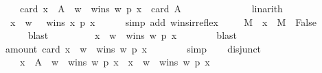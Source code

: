 \begin{isabellebody}
\ \ \ \ {\isachardoublequoteopen}card\ {\isacharbraceleft}{\kern0pt}x\ {\isasymin}\ A\ {\isacharminus}{\kern0pt}\ {\isacharbraceleft}{\kern0pt}w{\isacharbraceright}{\kern0pt}\ {\isachardot}{\kern0pt}\ wins\ w\ p\ x{\isacharbraceright}{\kern0pt}\ {\isacharequal}{\kern0pt}\ card\ {\isacharparenleft}{\kern0pt}A{\isacharparenright}{\kern0pt}\ {\isacharminus}{\kern0pt}\ {}{\isachardoublequoteclose}\isanewline
\ \ \ \ \isamarkupfalse%
\ {\isachardoublequoteopen}{}{}{\isachardoublequoteclose}\isanewline
\ \ \ \ \isamarkupfalse%
\ linarith\isanewline
\ \ \isamarkupfalse%
\ {}{\isacharcolon}{\kern0pt}\ {\isachardoublequoteopen}{\isasymforall}x\ {\isasymin}\ {\isacharbraceleft}{\kern0pt}w{\isacharbraceright}{\kern0pt}\ {\isachardot}{\kern0pt}\ {\isasymnot}\ wins\ x\ p\ x{\isachardoublequoteclose}\isanewline
\ \ \ \ \isamarkupfalse%
\ {\isacharparenleft}{\kern0pt}simp\ add{\isacharcolon}{\kern0pt}\ wins{\isacharunderscore}{\kern0pt}irreflex{\isacharparenright}{\kern0pt}\isanewline
\ \ \isamarkupfalse%
\ {}{\isacharcolon}{\kern0pt}\ {\isachardoublequoteopen}{\isasymforall}M\ {\isachardot}{\kern0pt}\ {\isacharbraceleft}{\kern0pt}x\ {\isasymin}\ M\ {\isachardot}{\kern0pt}\ False{\isacharbraceright}{\kern0pt}\ {\isacharequal}{\kern0pt}\ {\isacharbraceleft}{\kern0pt}{\isacharbraceright}{\kern0pt}{\isachardoublequoteclose}\isanewline
\ \ \ \ \isamarkupfalse%
\ blast\isanewline
\ \ \isamarkupfalse%
\ {}\ {}\isanewline
\ \ \isamarkupfalse%
\ {\isachardoublequoteopen}{\isacharbraceleft}{\kern0pt}x\ {\isasymin}\ {\isacharbraceleft}{\kern0pt}w{\isacharbraceright}{\kern0pt}\ {\isachardot}{\kern0pt}\ wins\ w\ p\ x{\isacharbraceright}{\kern0pt}\ {\isacharequal}{\kern0pt}\ {\isacharbraceleft}{\kern0pt}{\isacharbraceright}{\kern0pt}{\isachardoublequoteclose}\isanewline
\ \ \ \ \isamarkupfalse%
\ blast\isanewline
\ \ \isamarkupfalse%
\ amount{}{\isacharcolon}{\kern0pt}\ {\isachardoublequoteopen}card\ {\isacharbraceleft}{\kern0pt}x\ {\isasymin}\ {\isacharbraceleft}{\kern0pt}w{\isacharbraceright}{\kern0pt}\ {\isachardot}{\kern0pt}\ wins\ w\ p\ x{\isacharbraceright}{\kern0pt}\ {\isacharequal}{\kern0pt}\ {}{\isachardoublequoteclose}\isanewline
\ \ \ \ \isamarkupfalse%
\ simp\isanewline
\ \ \isamarkupfalse%
\ disjunct{\isacharcolon}{\kern0pt}\isanewline
\ \ \ \ {\isachardoublequoteopen}{\isacharbraceleft}{\kern0pt}x\ {\isasymin}\ A\ {\isacharminus}{\kern0pt}\ {\isacharbraceleft}{\kern0pt}w{\isacharbraceright}{\kern0pt}\ {\isachardot}{\kern0pt}\ wins\ w\ p\ x{\isacharbraceright}{\kern0pt}\ {\isasyminter}\ {\isacharbraceleft}{\kern0pt}x\ {\isasymin}\ {\isacharbraceleft}{\kern0pt}w{\isacharbraceright}{\kern0pt}\ {\isachardot}{\kern0pt}\ wins\ w\ p\ x{\isacharbraceright}{\kern0pt}\ {\isacharequal}{\kern0pt}\ {\isacharbraceleft}{\kern0pt}{\isacharbraceright}{\kern0pt}{\isachardoublequoteclose}\isanewline

\end{isabellebody}
